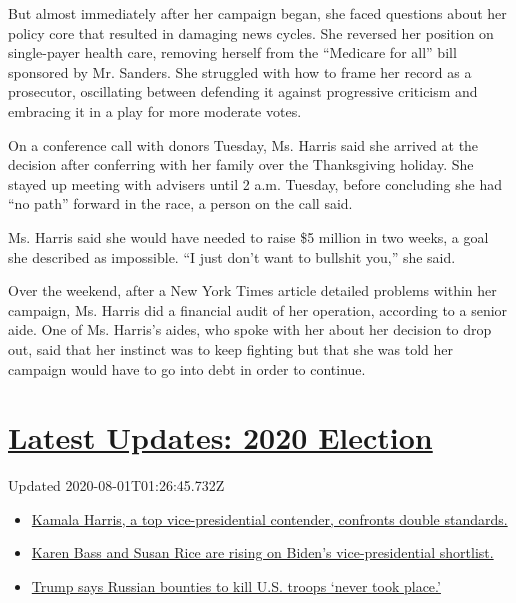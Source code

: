 But almost immediately after her campaign began, she faced questions
about her policy core that resulted in damaging news cycles. She
reversed her position on single-payer health care, removing herself from
the ``Medicare for all'' bill sponsored by Mr. Sanders. She struggled
with how to frame her record as a prosecutor, oscillating between
defending it against progressive criticism and embracing it in a play
for more moderate votes.

On a conference call with donors Tuesday, Ms. Harris said she arrived at
the decision after conferring with her family over the Thanksgiving
holiday. She stayed up meeting with advisers until 2 a.m. Tuesday,
before concluding she had ``no path'' forward in the race, a person on
the call said.

Ms. Harris said she would have needed to raise \$5 million in two weeks,
a goal she described as impossible. ``I just don't want to bullshit
you,'' she said.

Over the weekend, after a New York Times article detailed problems
within her campaign, Ms. Harris did a financial audit of her operation,
according to a senior aide. One of Ms. Harris's aides, who spoke with
her about her decision to drop out, said that her instinct was to keep
fighting but that she was told her campaign would have to go into debt
in order to continue.

\hypertarget{latest-updates-2020-election}{%
\section{\texorpdfstring{\href{https://www.nytimes.com/2020/07/31/us/elections/biden-vs-trump.html?action=click\&pgtype=Article\&state=default\&region=MAIN_CONTENT_1\&context=storylines_live_updates}{Latest
Updates: 2020
Election}}{Latest Updates: 2020 Election}}\label{latest-updates-2020-election}}

Updated 2020-08-01T01:26:45.732Z

\begin{itemize}
\tightlist
\item
  \href{https://www.nytimes.com/2020/07/31/us/elections/biden-vs-trump.html?action=click\&pgtype=Article\&state=default\&region=MAIN_CONTENT_1\&context=storylines_live_updates\#link-29fdff45}{Kamala
  Harris, a top vice-presidential contender, confronts double
  standards.}
\item
  \href{https://www.nytimes.com/2020/07/31/us/elections/biden-vs-trump.html?action=click\&pgtype=Article\&state=default\&region=MAIN_CONTENT_1\&context=storylines_live_updates\#link-13ec3d9c}{Karen
  Bass and Susan Rice are rising on Biden's vice-presidential
  shortlist.}
\item
  \href{https://www.nytimes.com/2020/07/31/us/elections/biden-vs-trump.html?action=click\&pgtype=Article\&state=default\&region=MAIN_CONTENT_1\&context=storylines_live_updates\#link-49e9a016}{Trump
  says Russian bounties to kill U.S. troops `never took place.'}
\end{itemize}

